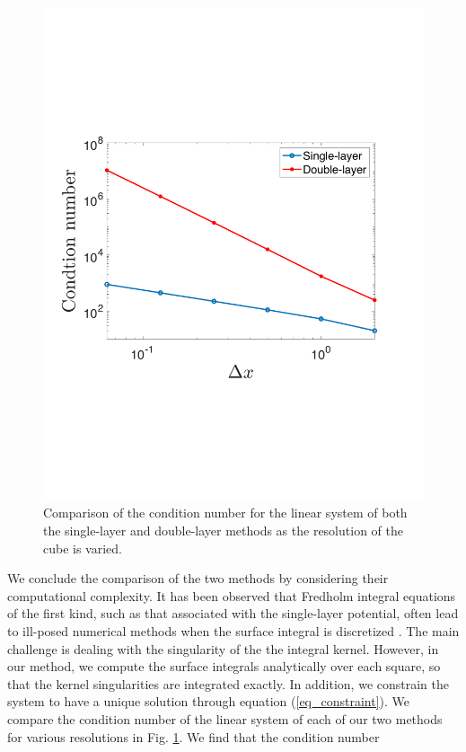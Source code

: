 \begin{figure}[ht]
	\begin{center}
		\hspace{0.1cm}
		\includegraphics[scale = 0.5]{./figures/fig_con_new}
	\end{center}
	\caption{Comparison of the condition number for the linear system of both the single-layer and double-layer methods as the resolution of the cube is varied. }
	\label{fig_condition_number}
\end{figure}
\par
We conclude the comparison of the two methods by considering their computational complexity.
It has been observed that Fredholm integral equations of the  first kind, such as that associated with the single-layer potential, often lead to ill-posed numerical
methods when the surface integral is discretized \cite{delves_numerical_1974, karrila_integral_1989}.
The main challenge is dealing with the singularity of the 
the integral kernel. However, in our method, we compute the surface integrals analytically over each square, so that the kernel singularities are integrated exactly. In addition, we constrain the system to have a unique solution through equation (\ref{eq_constraint}). We compare the condition number of the linear system of each of our two methods for various resolutions in Fig. \ref{fig_condition_number}. We find that the condition number
